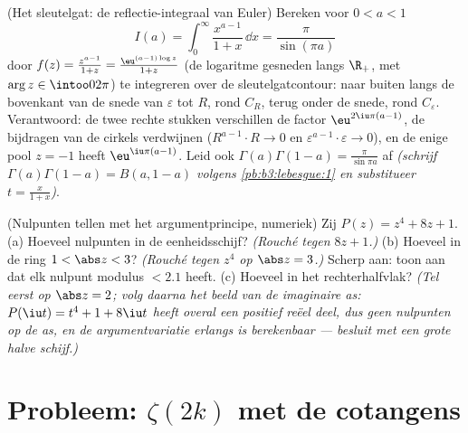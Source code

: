 \begin{exercise}[$\star\star\star$]\label{exo:b3:residues:11}
(Het sleutelgat: de reflectie-integraal van Euler) Bereken voor
$0 < a < 1$
\[
I(a) = \int_0^{\infty}\frac{x^{a-1}}{1 + x}\,\dd x =
\frac{\pi}{\sin(\pi a)}
\]
door $f(z) = \frac{z^{a-1}}{1+z} = \frac{\eu^{(a-1)\log z}}{1 +
z}$ (de logaritme gesneden langs $\R_+$, met $\arg z \in
\intoo0{2\pi}$) te integreren over de sleutelgatcontour: naar
buiten langs de bovenkant van de snede van $\varepsilon$ tot
$R$, rond $C_R$, terug onder de snede, rond $C_\varepsilon$.
Verantwoord: de twee rechte stukken verschillen de factor
$\eu^{2\iu\pi(a-1)}$, de bijdragen van de cirkels verdwijnen
($R^{a-1}\cdot R \to 0$ en $\varepsilon^{a-1}\cdot\varepsilon \to
0$), en de enige pool $z = -1$ heeft  $\eu^{\iu\pi(a -
1)}$. Leid ook $\Gamma(a)\Gamma(1 - a) = \frac\pi{\sin\pi a}$ af
\emph{(schrijf $\Gamma(a)\Gamma(1-a) = B(a, 1-a)$ volgens
\cref{pb:b3:lebesgue:1} en substitueer $t = \frac{x}{1+x}$)}.
\end{exercise}

\begin{exercise}[$\star\star$]\label{exo:b3:residues:12}
(Nulpunten tellen met het argumentprincipe, numeriek) Zij $P(z) =
z^4 + 8z + 1$.
(a) Hoeveel nulpunten in de eenheidsschijf? \emph{(Rouché tegen
$8z + 1$.)}
(b) Hoeveel in de ring $1 < \abs z < 3$? \emph{(Rouché tegen
$z^4$ op $\abs z = 3$.)} Scherp aan: toon aan dat elk nulpunt
modulus $< 2.1$ heeft.
(c) Hoeveel in het rechterhalfvlak? \emph{(Tel eerst op $\abs z =
2$; volg daarna het beeld van de imaginaire as: $P(\iu t) = t^4 +
1 + 8\iu t$ heeft overal een positief reëel deel, dus geen
nulpunten op de as, en de argumentvariatie erlangs is
berekenbaar --- besluit met een grote halve schijf.)}
\end{exercise}

\section{Probleem: \texorpdfstring{$\zeta(2k)$}{zeta(2k)} met de
cotangens}

